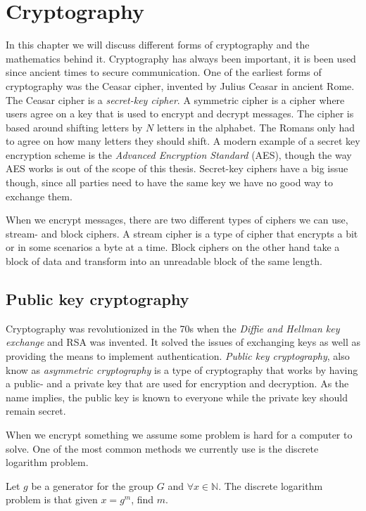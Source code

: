 \chapter{Cryptography\label{crypto}}
In this chapter we will discuss different forms of cryptography and the
mathematics behind it. Cryptography has always been important, it is been used
since ancient times to secure communication. One of the earliest forms of
cryptography was the Ceasar cipher, invented by Julius Ceasar in ancient Rome.
The Ceasar cipher is a \textit{secret-key cipher}. A symmetric cipher is a
cipher where users agree on a key that is used to encrypt and decrypt messages.
The cipher is based around shifting letters by $N$ letters in the alphabet. The
Romans only had to agree on how many letters they should shift. A modern
example of a secret key encryption scheme is the \textit{Advanced Encryption
Standard} (AES), though the way AES works is out of the scope of this thesis.
Secret-key ciphers have a big issue though, since all parties need to have the
same key we have no good way to exchange them.

When we encrypt messages, there are two different types of ciphers we can use,
stream- and block ciphers. A stream cipher is a type of cipher that encrypts a
bit or in some scenarios a byte at a time. Block ciphers on the other hand take
a block of data and transform into an unreadable block of the same length.


\section{Public key cryptography}
Cryptography was revolutionized in the 70s when the \textit{Diffie and Hellman
key exchange} and RSA was invented. It solved the issues of exchanging keys as
well as providing the means to implement authentication. \textit{Public key
cryptography}, also know as \textit{asymmetric cryptography} is a type of
cryptography that works by having a public- and a private key
that are used for encryption and decryption. As the name implies, the public
key is known to everyone while the private key should remain secret.

When we encrypt something we assume some problem is hard for a computer to
solve. One of the most common methods we currently use is the discrete
logarithm problem.

\begin{definition}
    Let $g$ be a generator for the group $G$ and $\forall x \in \mathbb{N}$. The
    discrete logarithm problem is that given $x = g^m$, find $m$.
\end{definition}

